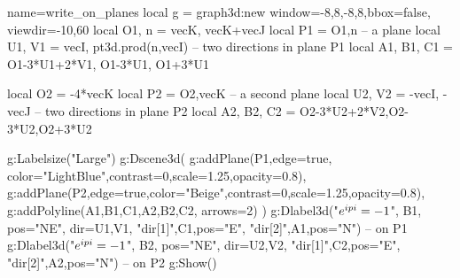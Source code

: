 \documentclass[border=5pt]{standalone}%
\begin{document}
\begin{luadraw}{name=write_on_planes}
local g = graph3d:new{ window={-8,8,-8,8},bbox=false, viewdir={-10,60} }
local O1, n = vecK, vecK+vecJ
local P1 = {O1,n} -- a plane
local U1, V1 = vecI, pt3d.prod(n,vecI) -- two directions in plane P1
local A1, B1, C1 = O1-3*U1+2*V1, O1-3*U1, O1+3*U1

local O2 =  -4*vecK
local P2 = {O2,vecK} -- a second plane
local U2, V2 = -vecI, -vecJ -- two directions in plane P2
local A2, B2, C2 = O2-3*U2+2*V2,O2-3*U2,O2+3*U2

g:Labelsize("Large")
g:Dscene3d( 
    g:addPlane(P1,{edge=true, color="LightBlue",contrast=0,scale=1.25,opacity=0.8}),
    g:addPlane(P2,{edge=true,color="Beige",contrast=0,scale=1.25,opacity=0.8}),
    g:addPolyline({{A1,B1,C1},{A2,B2,C2}}, {arrows=2}) )
g:Dlabel3d("$e^{i\\pi}=-1$", B1, {pos="NE", dir={U1,V1}}, "dir[1]",C1,{pos="E"}, "dir[2]",A1,{pos="N"}) -- on P1
g:Dlabel3d("$e^{i\\pi}=-1$", B2, {pos="NE", dir={U2,V2}}, "dir[1]",C2,{pos="E"}, "dir[2]",A2,{pos="N"}) -- on P2
g:Show()
\end{luadraw}
\end{document}
